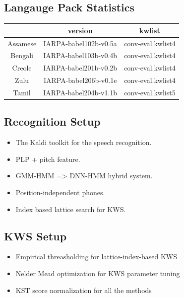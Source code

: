 \documentclass[landscape,final,archE1,fontscale=0.35]{baposter}
\begin{document}
\begin{poster}
{\subsection*{Langauge Pack Statistics}
\begin{center}
  \begin{tabular}{c|c|c}
    \hline
              & version     & kwlist\\
    \hline
    Assamese & IARPA-babel102b-v0.5a   & conv-eval.kwlist4 \\
    Bengali  & IARPA-babel103b-v0.4b   & conv-eval.kwlist4 \\
    Creole   & IARPA-babel201b-v0.2b   & conv-eval.kwlist4 \\
    Zulu      & IARPA-babel206b-v0.1e  & conv-eval.kwlist4 \\
    Tamil     & IARPA-babel204b-v1.1b  & conv-eval.kwlist5 \\
    \hline
  \end{tabular}
\end{center}
\vspace{-1.3em}

\subsection*{Recognition Setup}
\begin{itemize}
\setlength \itemsep{0.2em}
\item The Kaldi toolkit for the speech recognition.
\item PLP + pitch feature.
\item GMM-HMM => DNN-HMM hybrid system.
\item Position-independent phones.
\item Index based lattice search for KWS.
\end{itemize}
\vspace{-1em}

\subsection*{KWS Setup}
\begin{itemize}
\setlength \itemsep{0.2em}
\item Empirical threasholding for lattice-index-based KWS
\item Nelder Mead optimization for KWS parameter tuning
\item KST score normalization for all the methods
\end{itemize}
}


\end{poster}
\end{document}
